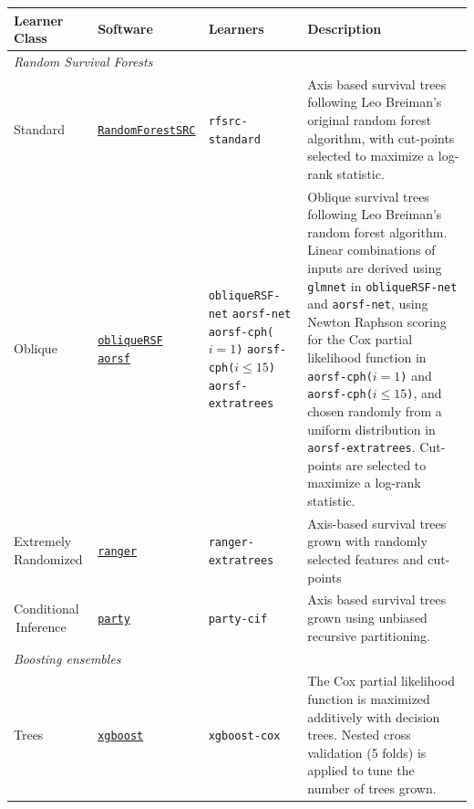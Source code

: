 \documentclass[twoside,11pt]{article}\usepackage[]{graphicx}\usepackage[]{xcolor}
\begin{document}
\begin{landscape}

\begin{table}[h!]
\centering
\begin{tabular}{p{2cm} | p{3cm} p{4cm} p{12cm}}
 \hline
 Learner Class & Software & Learners & Description \\ [0.5ex]
 \hline\hline
 \multicolumn{3}{l}{\textit{Random Survival Forests}}\\
 \hline\hline
 Standard & \href{https://www.randomforestsrc.org/index.html}{\texttt{RandomForestSRC}} & \texttt{rfsrc-standard} & Axis based survival trees following Leo Breiman's original random forest algorithm, with cut-points selected to maximize a log-rank statistic.  \\ \hline
 Oblique & \href{https://CRAN.R-project.org/package=obliqueRSF}{\texttt{obliqueRSF}} \newline \href{https://bcjaeger.github.io/aorsf/}{\texttt{aorsf}} &
 \texttt{obliqueRSF-net} \newline
 \texttt{aorsf-net} \newline
 \texttt{aorsf-cph($i=1$)} \newline
 \texttt{aorsf-cph($i \leq 15$)} \newline
 \texttt{aorsf-extratrees} &
 Oblique survival trees following Leo Breiman's random forest algorithm. Linear combinations of inputs are derived using \texttt{glmnet} in \texttt{obliqueRSF-net} and \texttt{aorsf-net}, using Newton Raphson scoring for the Cox partial likelihood function in \texttt{aorsf-cph($i=1$)} and \texttt{aorsf-cph($i \leq 15$)}, and chosen randomly from a uniform distribution in \texttt{aorsf-extratrees}. Cut-points are selected to maximize a log-rank statistic. \\ \hline
 Extremely \,Randomized & \href{https://CRAN.R-project.org/package=ranger}{\texttt{ranger}} & \texttt{ranger-extratrees} & Axis-based survival trees grown with randomly selected features and cut-points\\ \hline
 Conditional \,Inference & \href{http://party.r-forge.r-project.org/}{\texttt{party}} & \texttt{party-cif} & Axis based survival trees grown using unbiased recursive partitioning.  \\
 \hline\hline
 \multicolumn{3}{l}{\textit{Boosting ensembles}}\\
 \hline\hline
 Trees & \href{https://xgboost.readthedocs.io/en/stable/#}{\texttt{xgboost}} & \texttt{xgboost-cox} &  The Cox partial likelihood function is maximized additively with decision trees. Nested cross validation (5 folds) is applied to tune the number of trees grown.  \\

\end{tabular}
\end{table}
\end{landscape}
\end{document}
